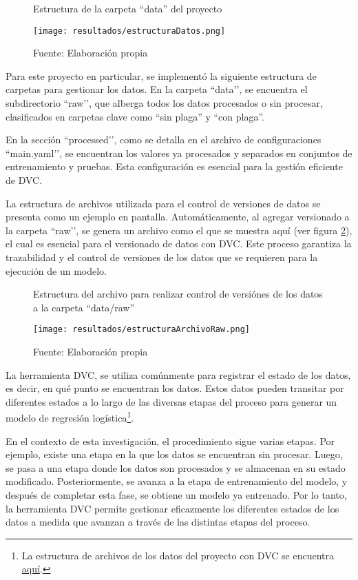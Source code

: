 \begin{figure}[h]
\centering
\caption{Estructura de la carpeta ``data'' del proyecto}
\texttt{[image: resultados/estructuraDatos.png]}
\caption*{\footnotesize Fuente: Elaboración propia}
\label{fig:figuraEstructuraDatos}
\end{figure}

Para este proyecto en particular, se implementó la siguiente estructura de carpetas para gestionar los datos. En la carpeta ``data’’, se encuentra el subdirectorio ``raw’’, que alberga todos los datos procesados o sin procesar, clasificados en carpetas clave como ``sin plaga'' y ``con plaga''.

En la sección ``processed’’, como se detalla en el archivo de configuraciones ``main.yaml’’, se encuentran los valores ya procesados y separados en conjuntos de entrenamiento y pruebas. Esta configuración es esencial para la gestión eficiente de DVC.

La estructura de archivos utilizada para el control de versiones de datos se presenta como un ejemplo en pantalla. Automáticamente, al agregar versionado a la carpeta ``raw’’, se genera un archivo como el que se muestra aquí (ver figura \ref{fig:figuraEstructuraArchivoRaw}), el cual es esencial para el versionado de datos con DVC. Este proceso garantiza la trazabilidad y el control de versiones de los datos que se requieren para la ejecución de un modelo.

\newpage

\begin{figure}[h]
\centering
\caption{Estructura del archivo para realizar control de versiónes de los datos a la carpeta ``data/raw''}
\texttt{[image: resultados/estructuraArchivoRaw.png]}
\caption*{\footnotesize Fuente: Elaboración propia}
\label{fig:figuraEstructuraArchivoRaw}
\end{figure}

La herramienta DVC, se utiliza comúnmente para registrar el estado de los datos, es decir, en qué punto se encuentran los datos. Estos datos pueden transitar por diferentes estados a lo largo de las diversas etapas del proceso para generar un modelo de regresión logística\footnote{La estructura de archivos de los datos del proyecto con DVC se encuentra \href{https://github.com/juferoto/mlops_project/blob/master/dvc.yaml}{aquí}.}.

En el contexto de esta investigación, el procedimiento sigue varias etapas. Por ejemplo, existe una etapa en la que los datos se encuentran sin procesar. Luego, se pasa a una etapa donde los datos son procesados y se almacenan en su estado modificado. Posteriormente, se avanza a la etapa de entrenamiento del modelo, y después de completar esta fase, se obtiene un modelo ya entrenado. Por lo tanto, la herramienta DVC permite gestionar eficazmente los diferentes estados de los datos a medida que avanzan a través de las distintas etapas del proceso.

